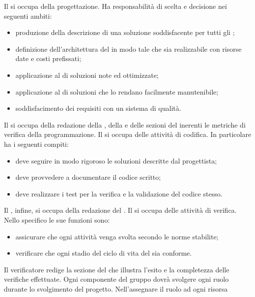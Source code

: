 				Il  si occupa della progettazione. Ha responsabilità di scelta e decisione nei seguenti ambiti:
				\begin{itemize}
					\item produzione della descrizione di una soluzione soddisfacente per tutti gli ;
					\item definizione dell'architettura del  in modo tale che sia realizzabile con risorse date e costi prefissati;
					\item applicazione al  di soluzioni note ed ottimizzate;
					\item applicazione al  di soluzioni che lo rendano facilmente manutenibile;
					\item soddisfacimento dei requisiti con un sistema di qualità.
				\end{itemize}
				Il  si occupa della redazione della , della  e delle sezioni del  inerenti le metriche di verifica della programmazione.
				Il  si occupa delle attività di codifica. In particolare ha i seguenti compiti:
				\begin{itemize}
					\item deve seguire in modo rigoroso le soluzioni descritte dal progettista;
					\item deve provvedere a documentare il codice scritto;
					\item deve realizzare i test per la verifica e la validazione del codice stesso.
				\end{itemize}
				Il , infine, si occupa della redazione del .
				Il  si occupa delle attività di verifica. Nello specifico le sue funzioni sono:
				\begin{itemize}
					\item assicurare che ogni attività venga svolta secondo le norme stabilite;
					\item verificare che ogni stadio del ciclo di vita del  sia conforme.
				\end{itemize}
				Il verificatore redige la sezione del  che illustra l’esito e la completezza delle verifiche effettuate.
			Ogni componente del gruppo dovrà svolgere ogni ruolo durante lo svolgimento del progetto. Nell'assegnare il ruolo ad ogni risorsa
